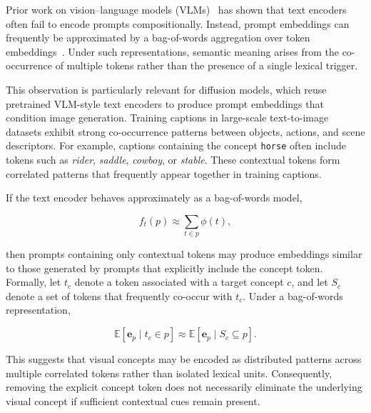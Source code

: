 Prior work on vision–language models (VLMs)~\cite{radford2021learning} has shown that text encoders
often fail to encode prompts compositionally. Instead, prompt embeddings
can frequently be approximated by a bag-of-words aggregation over token
embeddings~\cite{yuksekgonul2022and}. Under such representations, semantic
meaning arises from the co-occurrence of multiple tokens rather than the
presence of a single lexical trigger.

This observation is particularly relevant for diffusion models, which
reuse pretrained VLM-style text encoders to produce prompt embeddings
that condition image generation. Training captions in large-scale
text-to-image datasets exhibit strong co-occurrence patterns between
objects, actions, and scene descriptors. For example, captions
containing the concept \texttt{horse} often include tokens such as
\textit{rider}, \textit{saddle}, \textit{cowboy}, or \textit{stable}.
These contextual tokens form correlated patterns that frequently appear
together in training captions.

If the text encoder behaves approximately as a bag-of-words model,

\[
f_t(p) \approx \sum_{t \in p} \phi(t),
\]

then prompts containing only contextual tokens may produce embeddings
similar to those generated by prompts that explicitly include the
concept token. Formally, let $t_c$ denote a token associated with a
target concept $c$, and let $S_c$ denote a set of tokens that frequently
co-occur with $t_c$. Under a bag-of-words representation,

\[
\mathbb{E}[\mathbf{e}_p \mid t_c \in p]
\approx
\mathbb{E}[\mathbf{e}_p \mid S_c \subseteq p].
\]

This suggests that visual concepts may be encoded as distributed
patterns across multiple correlated tokens rather than isolated
lexical units. Consequently, removing the explicit concept token
does not necessarily eliminate the underlying visual concept if
sufficient contextual cues remain present.